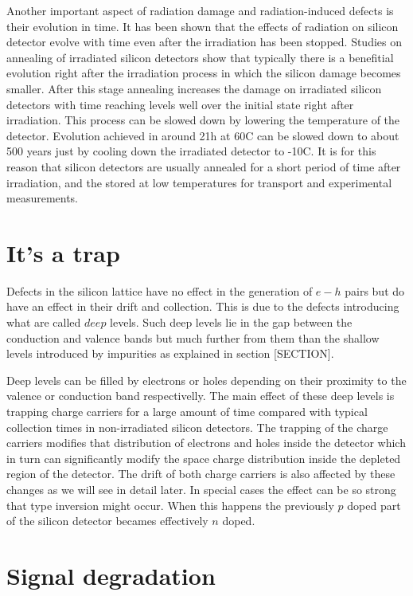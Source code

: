 Another important aspect of radiation damage and radiation-induced defects is their evolution in time. It has been shown that the effects of radiation on silicon detector evolve with time even after the irradiation has been stopped. Studies on annealing of irradiated silicon detectors show that typically there is a benefitial evolution right after the irradiation process in which the silicon damage becomes smaller. After this stage annealing increases the damage on irradiated silicon detectors with time reaching levels well over the initial state right after irradiation. This process can be slowed down by lowering the temperature of the detector. Evolution achieved in around 21h at 60C can be slowed down to about 500 years just by cooling down the irradiated detector to -10C. It is for this reason that silicon detectors are usually annealed for a short period of time after irradiation, and the stored at low temperatures for transport and experimental measurements.

\section{It's a trap}

Defects in the silicon lattice have no effect in the generation of $e-h$ pairs but do have an effect in their drift and collection. This is due to the defects introducing what are called $deep$ levels. Such deep levels lie in the gap between the conduction and valence bands but much further from them than the shallow levels introduced by impurities as explained in section [SECTION].

Deep levels can be filled by electrons or holes depending on their proximity to the valence or conduction band respectivelly. The main effect of these deep levels is trapping charge carriers for a large amount of time compared with typical collection times in non-irradiated silicon detectors. The trapping of the charge carriers modifies that distribution of electrons and holes inside the detector which in turn can significantly modify the space charge distribution inside the depleted region of the detector. The drift of both charge carriers is also affected by these changes as we will see in detail later. In special cases the effect can be so strong that type inversion might occur. When this happens the previously $p$ doped part of the silicon detector becames effectively $n$ doped. 

\section{Signal degradation}
